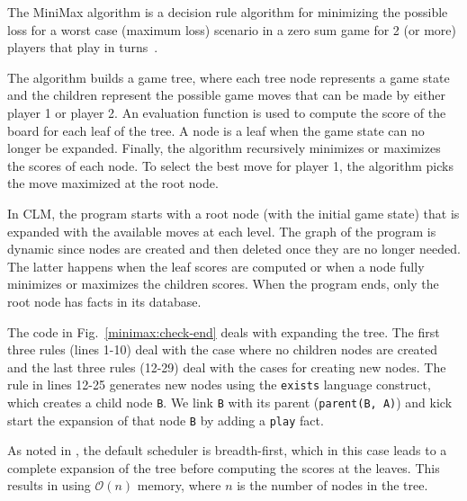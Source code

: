The MiniMax algorithm is a decision rule algorithm for minimizing the
possible loss for a worst case (maximum loss) scenario in a zero sum
game for 2 (or more) players that play in
turns~\cite{Edwards54}.

The algorithm builds a game tree, where each tree node represents a
game state and the children represent the possible game moves that can
be made by either player 1 or player 2.  An evaluation function is
used to compute the score of the board for each leaf of the tree. A
node is a leaf when the game state can no longer be expanded. Finally,
the algorithm recursively minimizes or maximizes the scores of each
node.  To select the best move for player 1, the algorithm picks the
move maximized at the root node.

In CLM, the program starts with a root node (with the initial game state)
that is expanded with the available moves at each level. The graph of the
program is dynamic since nodes are created and then deleted once they are no
longer needed. The latter happens when the
leaf scores are computed or when a node fully minimizes or maximizes the
children scores. When the program ends, only the root node has facts in its
database.

The code in Fig.~\ref{minimax:check-end} deals with expanding the tree.
The first three rules (lines 1-10) deal
with the case where no children nodes are created and the last three rules
(12-29) deal with the cases for creating new nodes.
The rule in lines 12-25 generates new nodes using the
\texttt{exists} language construct, which creates a child node 
\texttt{B}. We link \texttt{B} with its parent (\texttt{parent(B, A)})
and kick start the expansion of that node \texttt{B} by adding a \texttt{play}
fact.

As noted in , the default scheduler is
breadth-first, which in this case leads to a complete expansion of the
tree before computing the scores at the leaves.  This results in using
$\mathcal{O}(n)$ memory, where $n$ is the number of nodes in the tree.

